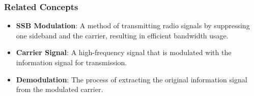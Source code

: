 \subsubsection{Related Concepts}
\begin{itemize}
    \item \textbf{SSB Modulation}: A method of transmitting radio signals by suppressing one sideband and the carrier, resulting in efficient bandwidth usage.
    \item \textbf{Carrier Signal}: A high-frequency signal that is modulated with the information signal for transmission.
    \item \textbf{Demodulation}: The process of extracting the original information signal from the modulated carrier.
\end{itemize}

